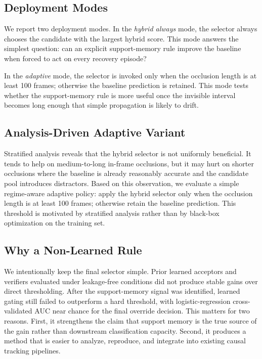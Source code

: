 \documentclass[10pt,journal,compsoc]{IEEEtran}
\begin{document}
\subsection{Deployment Modes}

We report two deployment modes. In the \emph{hybrid always} mode, the selector always chooses the candidate with the largest hybrid score. This mode answers the simplest question: can an explicit support-memory rule improve the baseline when forced to act on every recovery episode?

In the \emph{adaptive} mode, the selector is invoked only when the occlusion length is at least 100 frames; otherwise the baseline prediction is retained. This mode tests whether the support-memory rule is more useful once the invisible interval becomes long enough that simple propagation is likely to drift.

\subsection{Analysis-Driven Adaptive Variant}

Stratified analysis reveals that the hybrid selector is not uniformly beneficial. It tends to help on medium-to-long in-frame occlusions, but it may hurt on shorter occlusions where the baseline is already reasonably accurate and the candidate pool introduces distractors. Based on this observation, we evaluate a simple regime-aware adaptive policy: apply the hybrid selector only when the occlusion length is at least 100 frames; otherwise retain the baseline prediction. This threshold is motivated by stratified analysis rather than by black-box optimization on the training set.

\subsection{Why a Non-Learned Rule}

We intentionally keep the final selector simple. Prior learned acceptors and verifiers evaluated under leakage-free conditions did not produce stable gains over direct thresholding. After the support-memory signal was identified, learned gating still failed to outperform a hard threshold, with logistic-regression cross-validated AUC near chance for the final override decision. This matters for two reasons. First, it strengthens the claim that support memory is the true source of the gain rather than downstream classification capacity. Second, it produces a method that is easier to analyze, reproduce, and integrate into existing causal tracking pipelines.
\end{document}
